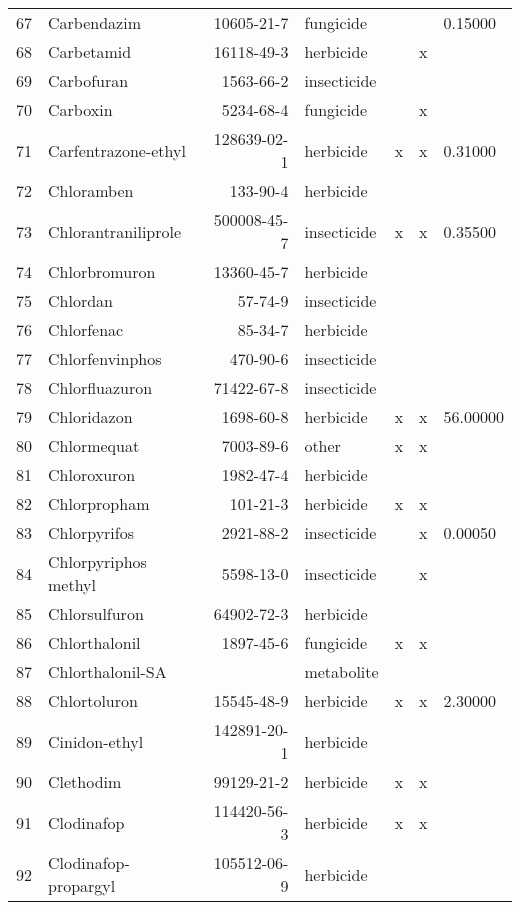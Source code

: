 \begin{longtable}{lp{3cm}rlp{1cm}p{1cm}p{1.5cm}}
  67 & Carbendazim & 10605-21-7 & fungicide &  &  & 0.15000 \\ 
  68 & Carbetamid & 16118-49-3 & herbicide &  & x &  \\ 
  69 & Carbofuran & 1563-66-2 & insecticide &  &  &  \\ 
  70 & Carboxin & 5234-68-4 & fungicide &  & x &  \\ 
  71 & Carfentrazone-ethyl & 128639-02-1 & herbicide & x & x & 0.31000 \\ 
  72 & Chloramben & 133-90-4 & herbicide &  &  &  \\ 
  73 & Chlorantraniliprole & 500008-45-7 & insecticide & x & x & 0.35500 \\ 
  74 & Chlorbromuron & 13360-45-7 & herbicide &  &  &  \\ 
  75 & Chlordan & 57-74-9 & insecticide &  &  &  \\ 
  76 & Chlorfenac & 85-34-7 & herbicide &  &  &  \\ 
  77 & Chlorfenvinphos & 470-90-6 & insecticide &  &  &  \\ 
  78 & Chlorfluazuron & 71422-67-8 & insecticide &  &  &  \\ 
  79 & Chloridazon & 1698-60-8 & herbicide & x & x & 56.00000 \\ 
  80 & Chlormequat & 7003-89-6 & other & x & x &  \\ 
  81 & Chloroxuron & 1982-47-4 & herbicide &  &  &  \\ 
  82 & Chlorpropham & 101-21-3 & herbicide & x & x &  \\ 
  83 & Chlorpyrifos & 2921-88-2 & insecticide &  & x & 0.00050 \\ 
  84 & Chlorpyriphos methyl & 5598-13-0 & insecticide &  & x &  \\ 
  85 & Chlorsulfuron & 64902-72-3 & herbicide &  &  &  \\ 
  86 & Chlorthalonil & 1897-45-6 & fungicide & x & x &  \\ 
  87 & Chlorthalonil-SA &  & metabolite &  &  &  \\ 
  88 & Chlortoluron & 15545-48-9 & herbicide & x & x & 2.30000 \\ 
  89 & Cinidon-ethyl & 142891-20-1 & herbicide &  &  &  \\ 
  90 & Clethodim & 99129-21-2 & herbicide & x & x &  \\ 
  91 & Clodinafop & 114420-56-3 & herbicide & x & x &  \\ 
  92 & Clodinafop-propargyl & 105512-06-9 & herbicide &  &  &  \\ 

\end{longtable}
